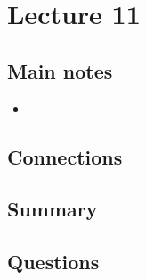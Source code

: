 \section{Lecture 11}

\subsection{Main notes}


\begin{itemize}
	\item
\end{itemize}


\subsection{Connections}


\subsection{Summary}


\subsection{Questions}
